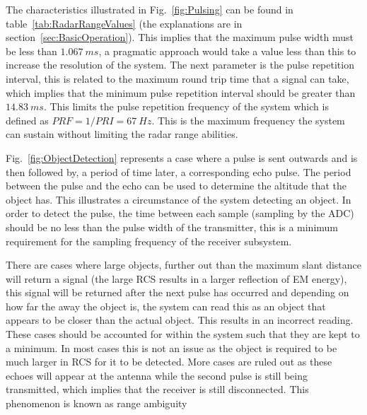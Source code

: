 \documentclass[11pt]{witseiepaper}
\begin{document}
\begin{bibunit}[witseie]
The characteristics illustrated in Fig.~\ref{fig:Pulsing} can be found in table~\ref{tab:RadarRangeValues} (the explanations are in section~\ref{sec:BasicOperation}). This implies that the maximum pulse width must be less than $1.067~ms$, a pragmatic approach would take a value less than this to increase the resolution of the system.
The next parameter is the pulse repetition interval, this is related to the maximum round trip time that a signal can take, which implies that the minimum pulse repetition interval should be greater than $14.83~ms$. This limits the pulse repetition frequency of the system which is defined as $PRF = 1/PRI = 67~Hz$. This is the maximum frequency the system can sustain without limiting the radar range abilities.

Fig.~\ref{fig:ObjectDetection} represents a case where a pulse is sent outwards and is then followed by, a period of time later, a corresponding echo pulse.
The period between the pulse and the echo can be used to determine the altitude that the object has. This illustrates a circumstance of the system detecting an object.
In order to detect the pulse, the time between each sample (sampling by the ADC) should be no less than the pulse width of the transmitter, this is a minimum requirement for the sampling frequency of the receiver subsystem.

There are cases where large objects, further out than the maximum slant distance will return a signal (the large RCS results in a larger reflection of EM energy), this signal will be returned after the next pulse has occurred and depending on how far the away the object is, the system can read this as an object that appears to be closer than the actual object. This results in an incorrect reading. These cases should be accounted for within the system such that they are kept to a minimum. In most cases this is not an issue as the object is required to be much larger in RCS for it to be detected. More cases are ruled out as these echoes will appear at the antenna while the second pulse is still being transmitted, which implies that the receiver is still disconnected.
This phenomenon is known as range ambiguity \cite[p.~22]{radarHandbook}


\end{bibunit}
\end{document}
